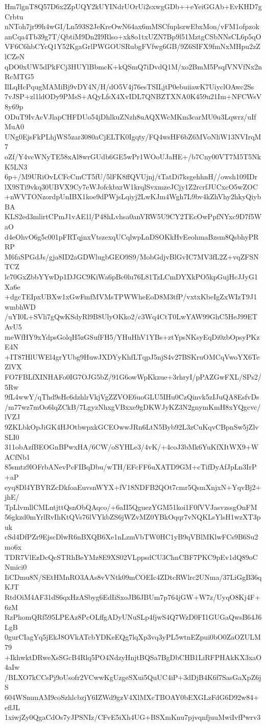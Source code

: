 Hm7lgnT8Q57D6x2ZpUQY2kUYINdrUOrUi2sxwgGDb++eYeiGGAb+EvKHD7gCrbtu
nNToh7jr99h4wGI/Ln593S2JeKreOwN64ax6mMSCfuplszwEbxMon/vFM1ofpzok
anCqa4Tb39g7T/QbtiM9Dn2I9Rlso+xk8o1txUZN7Bp9l51MztgCSbNNsCL6p5qO
VF6C6hbCYcQ1Y52KgaGrlPWGOUSRubgFVfwg6GB/9Z6SIFX9fmNxMHpu2zZlCZeN
qDO0xUW5dPkFCj3HUYlBbmcK+kQSmQ7iDvdQ1M/xo2BmM5PsqfVNVfNx2nRcMTG5
IlLqHcPqugMAMiBj9vDY4N/H/dO5V4j76esTSILjtP0ebuiiawK7UiyclOAwc2Ss
7vJSP+zl1ldODy9PMsS+AQyLfsX4XvIDL7QNBZTXNA0K459u21Im+NFCWsV8y69p
ODuT9IvAcVJlapCHFDUo54jDhlkuZNzh8uAQXWcMKm3carMU0u3Lqwrz/uIfMuA0
UNg0EjsFkPLhjWS5zar3080aCjELTK0Igqty/FQ4wsHF6bZ6MVoNliW13NVIrqM7
oZf/Y4vcWNyTE58xAl8wrGUdb6GE5wPr1WOoUJaHE+/b7Cny00VT7M5T5NkK5LN3
6p+/M9URiOvLCFcCmCT5fU/5lFK8ffQVUjnj/tTatDi7ksgehhnH//owsh109IDr
lX9STi9vkq30UBVX9Cy7eWJofckbxrW1krqlSvxmzeJCjy1Z2rcrfJUCxcO5wZOC
+nWVTONzordpUnIBX1koe9dPWjsLqiyj2LwKJm4Wgh7L9bv4kZhVhy2hkyQiybBA
KLS2ed3mlirtCPmJ1vAE1l/P48hLvhsa0anVRW5U9CY2TEcOwPpfNYxc9D7f5WaO
d4eOhvO6g5c001pFRTqjnxVtszexqUCqlwpLnDSOKkHvEeohmaBzsm8QsbhyPRRP
M6faSPGdJs/gja8ID2aGDWlugbGEO9S9/MobGdjvBlGvIC7MV3fL2Z+vqZFSNTCZ
lc70GxZbbYYwDp1DJGC9KiWa6pBc0lu76L81TzLCmDYXkPO5kpGujHcJJyG1Xa6e
+dgcTEIpxUBXw1xGwFmfMVMsTPWWheEoD8M3tfP/vxtxKbeIgZxWIzT9J1wmbhWD
/uYI0L+SVli7gQwKSdyRl9B8UlyOKko2/c3Wq4CtT0LwYAW99GhC5HeJ99ETAvU5
meWfHY9xYdpsGolqH5zGSufFH5/YHuHhV1YBs+ztYpsNKsyEqDi0zbOpsyPKzE4N
+IT87HlUWEl4grYUbg9HuwJXDYyKhfLTqpJ5njS4v27BSKruOMCqVwoYX6TeZlVX
FO7FBLfXINHAFo0IG7OJG5bZ/91G6owWpKkzue+3rhryI/pPAZGwFXL/SPs2/5Rw
9fL4wwY/qThd9sHc6dzhlrVkjVgZZVOE6uoGLU5IHu0CzQinvk5zIJuQA8EsfvDs
/m77wz7mOo6lqZCkB/7LgyzNhxgVBxxe9gDKWJyKZ3N2gnymKmH8xYQgcvc/lVZJ
9ZKLbkOpJiGK4HJOtbwpxkGCEOwwJRn6LtN5Byb92L3zCuKqvCBpnSw5jZlvSLI0
311obAzfBEOGnBPwxHA/6CW/oSYHLe3/4vK/+4coJ3bMk6YuKfXItWX9+WACfNb1
85smtz9lOFrbANevPcFIBqDbu/wTH/EFcFF6uXATD9GM+cTifDyAfJpLn3IrP+aP
eyq8Dl4YBYRZcDkfoaEuvsnWYX+fV18NDFB2QOt7cmr5QsmXnjxN+YqvBj2+jhE/
TpLlvmllCMLntjttQsnObQAqco/+6aII5QguezYGM51koi1F0fVVJasvzssgOnFM
56gkzd0mYrlRvIhKtQVs76lVYkbZS6jWZvMZ0YBkOqqr7vNQKLsYlsH1wzXT3puk
cSd4DfPZr9EjscDlwR6nBXQB6Xe1nLzmVbTW0HC1yB9qVBlMKlwFCs9B6Su2mo6x
TDR7VlEzDcQcSTRhBeYMz8E9XS02VLppsdCU3ChnCBF7PKC9pEv1dQ89oCNmici0
IiCDmu8N/SEtHMnRO3AAs8vVNtk09mCOEIc4ZDtcRWlrc2UNma/37LiGgB36qKJT
RtdOiM4AF31dS6qxHzASbyg6EdIiSxoJB6JBUm7p764jGW+W7z/UyqO8Kj4F+6zM
RzPhomQRf595LPEAz8PcOLffgADyUNuSLp4fjwS4Q7WzD0FI1GUGaQwsB64J6LgB
0gurCIagYq5jEkJ8OVkATcbYDKeEQg7lqXp3vq3yPL5wtnEZpui0bO0ZaOZULM79
+IkhwktDRweXsSGcB4Rlq5PO4NdzyHnjtBQSa7BgDbCHB1LiRFPHAkKX3xaO4aIw
/BLXO7kCCsPj9oUsofr2VCwwKgUzgeSXui5QuUC4iP+3dDjB4K6f7SasGaXpZ6jS
604WSmmAM9coSzhlcbzjY6IZWd9gzV4XlMXcTBOAY0bEXGLzFdG6D92w84+eflJL
1xiwjZy0QgaCdOs7yJPSNIz/CFvE5iXh4UG+BSXmKnu7pjvqnfjuuMwiIvfPwrv3
